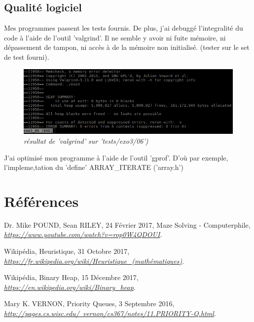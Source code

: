 \documentclass[10pt]{article}
\begin{document}
		\subsection{Qualité logiciel}
			Mes programmes passent les tests fournis.\newline    
			De plus, j'ai debuggé l'integralité du code à l'aide de l'outil 'valgrind'.
			Il ne semble y avoir ni fuite mémoire, ni dépassement de tampon, ni accès à de la mémoire non initialisé.
			(tester sur le set de test fourni).
			\begin{figure}[H]
				\begin{center}
					\includegraphics[width=12cm,height=\textheight,keepaspectratio]{./images/valgrind.png}
				\end{center}
				\caption{\textit{résultat de 'valgrind' sur 'tests/exo3/06')}}
			\end{figure}
			J'ai optimisé mon programme à l'aide de l'outil 'gprof'.
			D'où par exemple, l'impleme,tation du 'define' ARRAY\_ITERATE ('array.h')
	
	\section{Références}
		\begin{thebibliography}{}
				Dr. Mike POUND, Sean RILEY, 24 Février 2017,\newline
				Maze Solving - Computerphile,\newline
				\href{https://www.youtube.com/watch?v=rop0W4QDOUI}{\textit{https://www.youtube.com/watch?v=rop0W4QDOUI}}.
			  
				Wikipédia, Heuristique, 31 Octobre 2017,\newline
				\href{https://fr.wikipedia.org/wiki/Heuristique_(mathématiques)}
				      {\textit{https://fr.wikipedia.org/wiki/Heuristique\_(mathématiques)}}.
			  
				Wikipédia, Binary Heap, 15 Décembre 2017,\newline
				\href{https://en.wikipedia.org/wiki/Binary\_heap}
				      {\textit{https://en.wikipedia.org/wiki/Binary\_heap}}.

				Mary K. VERNON, Priority Queues, 3 Septembre 2016,\newline
				\href{http://pages.cs.wisc.edu/~vernon/cs367/notes/11.PRIORITY-Q.html}
					{\textit{http://pages.cs.wisc.edu/~vernon/cs367/notes/11.PRIORITY-Q.html}}.

  \end{thebibliography}
\end{document}

